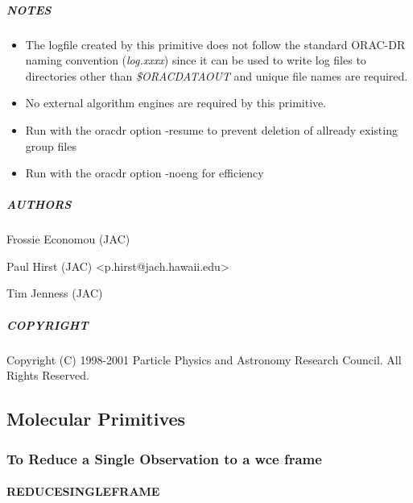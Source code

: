 \documentclass[twoside,11pt]{article}
\renewcommand{\_}{\texttt{\symbol{95}}}
\begin{document}
\subparagraph*{NOTES\label{_NIGHT_LOG__NOTES}}\begin{itemize}
\item 

The logfile created by this primitive does not follow the standard
ORAC-DR naming convention (\emph{log.xxxx}) since it can be used to write
log files to directories other than \emph{\$ORAC\_DATA\_OUT} and unique file
names are required.

\item 

No external algorithm engines are required by this primitive.

\item 

Run with the oracdr option -resume to prevent deletion of allready existing group files

\item 

Run with the oracdr option -noeng for efficiency

\end{itemize}
\subparagraph*{AUTHORS\label{_NIGHT_LOG__AUTHORS}}

Frossie Economou (JAC)



Paul Hirst (JAC) <p.hirst@jach.hawaii.edu>



Tim Jenness (JAC)

\subparagraph*{COPYRIGHT\label{_NIGHT_LOG__COPYRIGHT}}

Copyright (C) 1998-2001 Particle Physics and Astronomy Research
Council.  All Rights Reserved.


\subsection{Molecular Primitives}

\subsubsection{To Reduce a Single Observation to a \_wce frame}

\paragraph*{\_REDUCE\_SINGLE\_FRAME\_\label{_REDUCE_SINGLE_FRAME_}}
\end{document}

